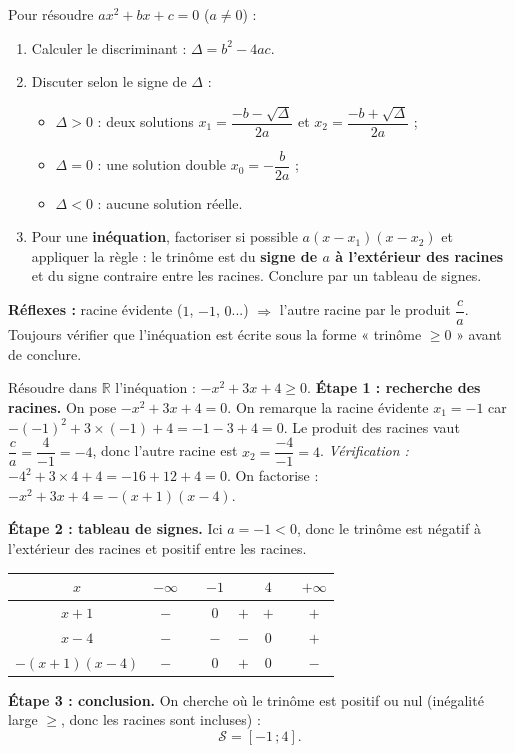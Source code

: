 \documentclass[11pt]{article}
\newcommand{\cle}[1]{{\popxbold\color{popdark}#1}}
\begin{document}
\begin{methode}
Pour résoudre $ax^2+bx+c=0$ ($a\neq 0$) :
\begin{enumerate}
\item Calculer le \cle{discriminant} : $\Delta=b^2-4ac$.
\item Discuter selon le signe de $\Delta$ :
\begin{itemize}
\item $\Delta>0$ : deux solutions $x_1=\dfrac{-b-\sqrt{\Delta}}{2a}$ et $x_2=\dfrac{-b+\sqrt{\Delta}}{2a}$ ;
\item $\Delta=0$ : une solution double $x_0=-\dfrac{b}{2a}$ ;
\item $\Delta<0$ : aucune solution réelle.
\end{itemize}
\item Pour une \textbf{inéquation}, factoriser si possible $a(x-x_1)(x-x_2)$ et appliquer la règle : le trinôme est du \textbf{signe de $a$ à l'extérieur des racines} et du signe contraire entre les racines. Conclure par un tableau de signes.
\end{enumerate}
\textbf{Réflexes :} racine évidente ($1$, $-1$, $0$...) $\Rightarrow$ l'autre racine par le produit $\dfrac{c}{a}$. Toujours vérifier que l'inéquation est écrite sous la forme « trinôme $\geq 0$ » avant de conclure.
\end{methode}

\begin{exoresolu}
Résoudre dans $\mathbb{R}$ l'inéquation : $-x^2+3x+4\geq 0$.
\tcblower
\textbf{Étape 1 : recherche des racines.} On pose $-x^2+3x+4=0$. On remarque la racine évidente $x_1=-1$ car $-(-1)^2+3\times(-1)+4=-1-3+4=0$.
Le produit des racines vaut $\dfrac{c}{a}=\dfrac{4}{-1}=-4$, donc l'autre racine est $x_2=\dfrac{-4}{-1}=4$.
\textit{Vérification :} $-4^2+3\times 4+4=-16+12+4=0$. 
On factorise : $-x^2+3x+4=-(x+1)(x-4)$.

\textbf{Étape 2 : tableau de signes.} Ici $a=-1<0$, donc le trinôme est négatif à l'extérieur des racines et positif entre les racines.
\begin{center}
\begin{tabular}{|c|ccccccc|}\hline
$x$ & $-\infty$ & & $-1$ & & $4$ & & $+\infty$ \\ \hline
$x+1$ & $-$ & & $0$ & $+$ & $+$ & & $+$ \\ \hline
$x-4$ & $-$ & & $-$ & $-$ & $0$ & & $+$ \\ \hline
$-(x+1)(x-4)$ & $-$ & & $0$ & $+$ & $0$ & & $-$ \\ \hline
\end{tabular}
\end{center}

\textbf{Étape 3 : conclusion.} On cherche où le trinôme est positif ou nul (inégalité large $\geq$, donc les racines sont incluses) :
\[ \mathcal{S}=[-1\,;4]. \]
\end{exoresolu}
\end{document}
